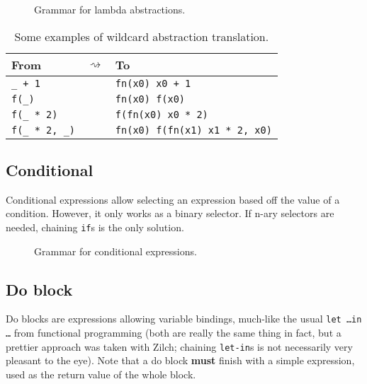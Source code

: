 \begin{figure}[H]
  \centering


  \caption{Grammar for lambda abstractions.}
  \label{fig:zilch-gramma-expressions-lambda-grammar}
\end{figure}

\begin{table}[htb]
  \begin{tabularx}{\textwidth}{YcY}
    \toprule
    From &  & To \\
    \midrule
    \verb|_ + 1| && \verb|fn(x0) x0 + 1| \\
    \verb|f(_)| && \verb|fn(x0) f(x0)| \\
    \verb|f(_ * 2)| && \verb|f(fn(x0) x0 * 2)| \\
    \verb|f(_ * 2, _)| && \verb|fn(x0) f(fn(x1) x1 * 2, x0)| \\
    \bottomrule
  \end{tabularx}

  \caption{Some examples of wildcard abstraction translation.}
  \label{table:zilch-grammar-expressions-lambda-translatewildcard}
\end{table}

\subsection{Conditional}\label{subsec:zilch-grammar-expressions-conditional}

Conditional expressions allow selecting an expression based off the value of a condition.
However, it only works as a binary selector.
If n-ary selectors are needed, chaining \texttt{if}s is the only solution.

\begin{figure}[H]
  \centering


  \caption{Grammar for conditional expressions.}
  \label{fig:zilch-gramma-expressions-conditional-grammar}
\end{figure}

\subsection{Do block}\label{subsec:zilch-grammar-expressions-do}

Do blocks are expressions allowing variable bindings, much-like the usual \texttt{let \ldots in \ldots} from functional programming (both are really the same thing in fact, but a prettier approach was taken with Zilch; chaining \texttt{let-in}s is not necessarily very pleasant to the eye).
Note that a do block \textbf{must} finish with a simple expression, used as the return value of the whole block.

